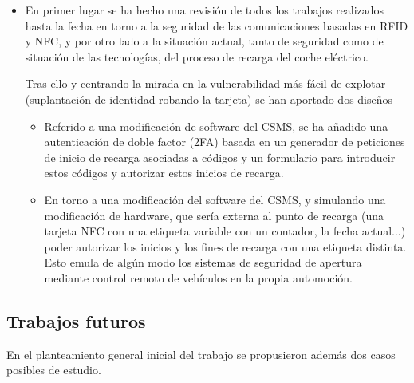 \documentclass[12pt,a4paper,onecolumn,oneside]{report}
\begin{document}
\begin{itemize}
\item En primer lugar se ha hecho una revisión de todos los trabajos realizados hasta la fecha en torno a la seguridad de las comunicaciones basadas en RFID y NFC, y por otro lado a la situación actual, tanto de seguridad como de situación de las tecnologías, del proceso de recarga del coche eléctrico.

Tras ello y centrando la mirada en la vulnerabilidad más fácil de explotar (suplantación de identidad robando la tarjeta) se han aportado dos diseños

\begin{itemize}
\item Referido a una modificación de software del CSMS, se ha añadido una autenticación de doble factor (2FA) basada en un generador de peticiones de inicio de recarga asociadas a códigos y un formulario para introducir estos códigos y autorizar estos inicios de recarga.

\item En torno a una modificación del software del CSMS, y simulando una modificación de hardware, que sería externa al punto de recarga (una tarjeta NFC con una etiqueta variable con un contador, la fecha actual...) poder autorizar los inicios y los fines de recarga con una etiqueta distinta. Esto emula de algún modo los sistemas de seguridad de apertura mediante control remoto de vehículos en la propia automoción.

\end{itemize}


\end{itemize}


\subsection*{Trabajos futuros}

En el planteamiento general inicial del trabajo se propusieron además dos casos posibles de estudio.
\end{document}
